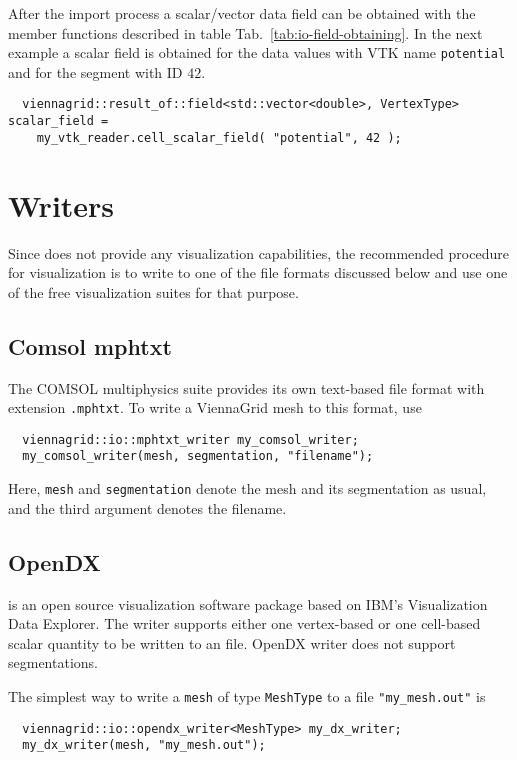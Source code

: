  After the import process a scalar/vector data field can be obtained with the member functions described in table Tab.~\ref{tab:io-field-obtaining}. In the next example a scalar field is obtained for the data values with VTK name \texttt{potential} and for the segment with ID $42$.

 \begin{lstlisting}
  viennagrid::result_of::field<std::vector<double>, VertexType> scalar_field =
    my_vtk_reader.cell_scalar_field( "potential", 42 );
 \end{lstlisting}



\section{Writers}
Since {\ViennaGrid} does not provide any visualization capabilities, the recommended procedure for visualization is
to write to one of the file formats discussed below and use one of the free visualization suites for that purpose.


 \subsection{Comsol mphtxt}
 The COMSOL multiphysics suite provides its own text-based file format with extension \lstinline|.mphtxt|.
 To write a ViennaGrid mesh to this format, use
 \begin{lstlisting}
  viennagrid::io::mphtxt_writer my_comsol_writer;
  my_comsol_writer(mesh, segmentation, "filename");
 \end{lstlisting}
 Here, \lstinline|mesh| and \lstinline|segmentation| denote the mesh and its segmentation as usual, and the third argument denotes the filename.

 \subsection{OpenDX}
 {\OpenDX} \cite{opendx} is an open source visualization software package based on IBM's Visualization Data Explorer.
 The writer supports either one vertex-based or one cell-based scalar quantity to be written to an {\OpenDX} file. OpenDX writer does not support segmentations.

 The simplest way to write a \lstinline|mesh| of type \lstinline|MeshType| to a file \lstinline|"my_mesh.out"| is
 \begin{lstlisting}
  viennagrid::io::opendx_writer<MeshType> my_dx_writer;
  my_dx_writer(mesh, "my_mesh.out");
 \end{lstlisting}

